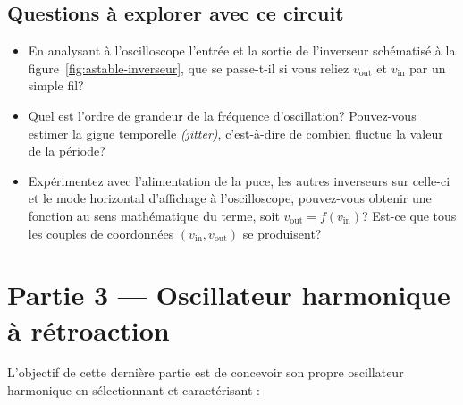 \documentclass[canadien,12pt,oneside,letterpaper]{article}
\begin{document}
\subsection{Questions à explorer avec ce circuit}
\begin{itemize}
    \item En analysant à l'oscilloscope l'entrée et la sortie de l'inverseur schématisé à la figure~\ref{fig:astable-inverseur}, que se passe-t-il si vous reliez $v_{\text{out}}$ et $v_{\text{in}}$ par un simple fil? %
    \item Quel est l'ordre de grandeur de la fréquence d'oscillation? Pouvez-vous estimer la gigue temporelle \textit{(jitter)}, c'est-à-dire de combien fluctue la valeur de la période?
    \item Expérimentez avec l'alimentation de la puce, les autres inverseurs sur celle-ci et le mode horizontal d'affichage à l'oscilloscope, pouvez-vous obtenir une fonction au sens mathématique du terme, soit $v_{\text{out}} = f\left(v_{\text{in}}\right)$? Est-ce que tous les couples de coordonnées $(v_{\text{in}},v_{\text{out}})$ se produisent? %
\end{itemize}

\section{Partie 3 --- Oscillateur harmonique à rétroaction}
L'objectif de cette dernière partie est de concevoir son propre oscillateur harmonique en sélectionnant et caractérisant :
\end{document}
